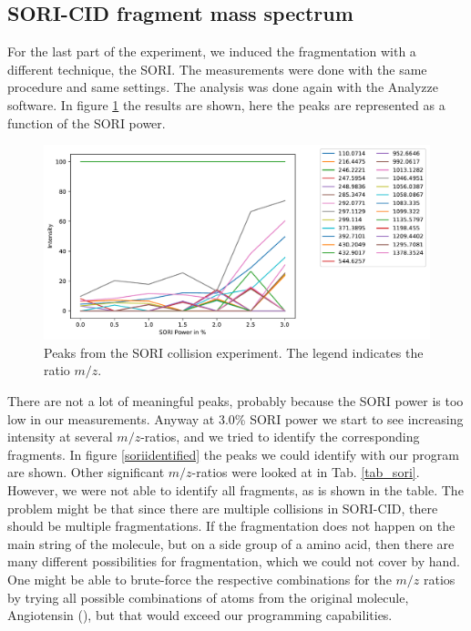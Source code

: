 \documentclass[a4paper,10pt]{article}
\begin{document}
\subsection{SORI-CID fragment mass spectrum}
For the last part of the experiment, we induced the fragmentation with a different technique, the SORI. The measurements were done with the same procedure and same settings. The analysis was done again with the Analyzze software. In figure \ref{soricollision} the results are shown, here the peaks are represented as a function of the SORI power.


\begin{figure}[H]
	\includegraphics[width = \textwidth]{sori_cid.pdf}
	\caption{Peaks from the SORI collision experiment. The legend indicates the ratio $m/z$.}
	\label{soricollision}
\end{figure}
There are not a lot of meaningful peaks, probably because the SORI power is too low in our measurements. Anyway at 3.0\% SORI power we start to see increasing intensity at several $m/z$-ratios, and we tried to identify the corresponding fragments. In figure \ref{soriidentified} the peaks we could identify with our program are shown. Other significant $m/z$-ratios were looked at in Tab. \ref{tab_sori}. However, we were not able to identify all fragments, as is shown in the table. The problem might be that since there are multiple collisions in SORI-CID, there should be multiple fragmentations. If the fragmentation does not happen on the main string of the molecule, but on a side group of a amino acid, then there are many different possibilities for fragmentation, which we could not cover by hand. One might be able to brute-force the respective combinations for the $m/z$ ratios by trying all possible combinations of atoms from the original molecule, Angiotensin (), but that would exceed our programming capabilities.
\end{document}
